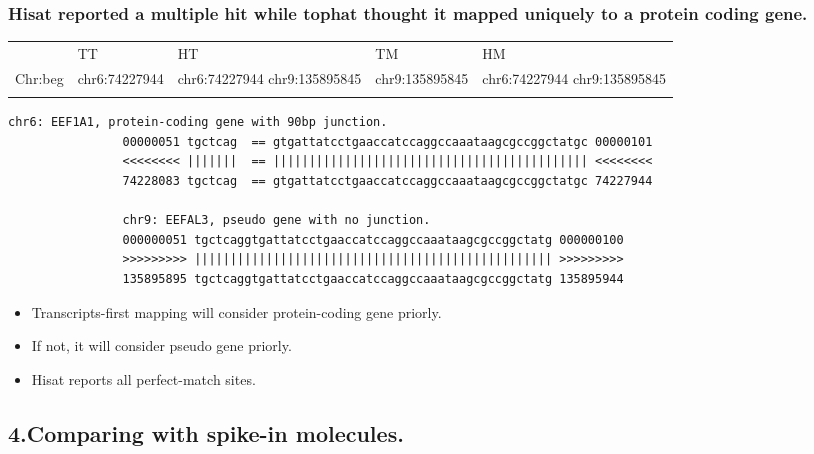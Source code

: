 \begin{frame}[c,fragile]
\frametitle{ Hisat reported a multiple hit while tophat thought it mapped uniquely to a protein coding gene. }
	\begin{examples}
		\tiny{
			\begin{table}
			\centering
			\begin{tabular}{  C{1cm}  C{1.2cm}  C{1.2cm}  C{1.2cm}  C{1.2cm}  }
			\hline\noalign{\smallskip}
						& TT 	& HT  &	TM	 & HM  	\\
			\noalign{\smallskip}\hline\noalign{\smallskip}
			Chr:beg	&	chr6:74227944		& chr6:74227944 chr9:135895845    &	chr9:135895845 & chr6:74227944 chr9:135895845	\\
			\noalign{\smallskip}\hline
			\end{tabular}
			\end{table}
		}
		\begin{lstlisting}[basicstyle=\tiny]
				chr6: EEF1A1, protein-coding gene with 90bp junction.
				00000051 tgctcag  == gtgattatcctgaaccatccaggccaaataagcgccggctatgc 00000101
				<<<<<<<< |||||||  == |||||||||||||||||||||||||||||||||||||||||||| <<<<<<<<
				74228083 tgctcag  == gtgattatcctgaaccatccaggccaaataagcgccggctatgc 74227944
				
				chr9: EEFAL3, pseudo gene with no junction.
				000000051 tgctcaggtgattatcctgaaccatccaggccaaataagcgccggctatg 000000100
				>>>>>>>>> |||||||||||||||||||||||||||||||||||||||||||||||||| >>>>>>>>>
				135895895 tgctcaggtgattatcctgaaccatccaggccaaataagcgccggctatg 135895944

		\end{lstlisting}
		\scriptsize{
			\begin{itemize}
				\item Transcripts-first mapping will consider protein-coding gene priorly. \\ \pause
				\item If not, it will consider pseudo gene priorly. \\ \pause
				\item Hisat reports all perfect-match sites.
			\end{itemize}
		}
		\end{examples}
	
\end{frame}

\subsection{4.Comparing with spike-in molecules.}

